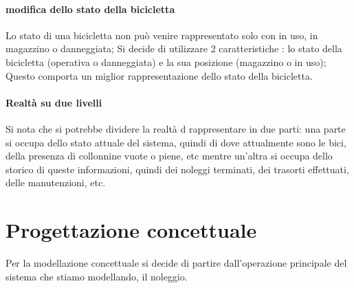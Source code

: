 \documentclass[a4paper,twoside]{article}
\begin{document}
\paragraph{modifica dello stato della bicicletta} Lo stato di una bicicletta non può venire rappresentato solo con in uso, in magazzino o danneggiata; Si decide di utilizzare 2 caratteristiche : lo stato della bicicletta (operativa o danneggiata) e la sua posizione (magazzino o in uso); Questo comporta un miglior rappresentazione dello stato della bicicletta.
\paragraph{Realtà su due livelli} Si nota che si potrebbe dividere la realtà d rappresentare in due parti: una parte si occupa dello stato attuale del sistema, quindi di dove attualmente sono le bici, della presenza di collonnine vuote o piene, etc mentre un'altra si occupa dello storico di queste informazioni, quindi dei noleggi terminati, dei trasorti effettuati, delle manutenzioni, etc.

\section{Progettazione concettuale}

Per la modellazione concettuale si decide di partire dall'operazione principale del sistema che stiamo modellando, il noleggio.
\end{document}

